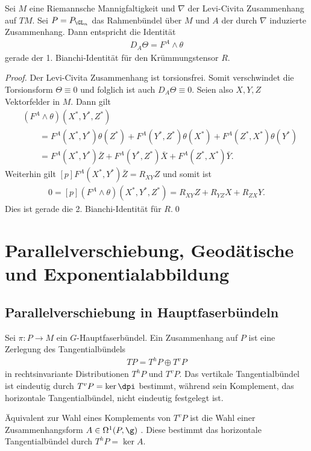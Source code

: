 \documentclass[%
	paper=a5,%
	fleqn,%
	DIV=18,%
	BCOR=0mm,
	fontsize=11pt,
	titlepage=false,%
	bibliography=totoc,
	DIV=18,%
	twoside=true,
	pdftitle=Riemannsche Geometrie,
	pdfauthor=Uwe Semmelmann,
	numbers=noendperiod]%
	{scrbook}
\begin{document}
\begin{lem}
Sei $M$ eine Riemannsche Mannigfaltigkeit und $\nabla$ der Levi-Civita
Zusammenhang auf $TM$. Sei $P=P_{\GL_n}$ das Rahmenbündel über $M$ und $A$ der
durch $\nabla$ induzierte Zusammenhang. Dann entspricht die Identität
\begin{align*}
D_A \Theta = F^A \wedge \theta
\end{align*}
gerade der 1. Bianchi-Identität für den Krümmungstensor $R$.\fish
\end{lem}
\begin{proof}
Der Levi-Civita Zusammenhang ist torsionsfrei. Somit verschwindet die
Torsionsform $\Theta \equiv 0$ und folglich ist auch $D_A \Theta \equiv 0$.
Seien also $X,Y,Z$ Vektorfelder in $M$. Dann gilt
\begin{align*}
&(F^A\wedge \theta)(X^*,Y^*,Z^*) \\
&\qquad=
F^A(X^*,Y^*)\theta(Z^*) + 
F^A(Y^*,Z^*)\theta(X^*) + 
F^A(Z^*,X^*)\theta(Y^*)\\
&\qquad =  
F^A(X^*,Y^*)\bar{Z} + 
F^A(Y^*,Z^*)\bar{X} + 
F^A(Z^*,X^*)\bar{Y}.
\end{align*}
Weiterhin gilt $[p]F^A(X^*,Y^*)\bar{Z} = R_{XY}Z$ und somit ist
\begin{align*}
0 =  [p](F^A\wedge \theta)(X^*,Y^*,Z^*) = 
R_{XY}Z
 + R_{YZ}X + R_{ZX}Y.
\end{align*}
Dies ist gerade die 2. Bianchi-Identität für $R$.\qed
\end{proof}


\chapter{Parallelverschiebung, Geodätische und Exponentialabbildung}

\section{Parallelverschiebung in Hauptfaserbündeln}

Sei $\pi\colon P\to M$ ein $G$-Hauptfaserbündel. Ein Zusammenhang auf $P$ ist eine Zerlegung des Tangentialbündels
\begin{align*}
TP = T^hP\oplus T^vP
\end{align*}
in rechtsinvariante Distributionen $T^hP$ und $T^vP$. Das vertikale Tangentialbündel ist eindeutig durch $T^vP=\ker \dpi$ bestimmt, während sein Komplement, das horizontale Tangentialbündel, nicht eindeutig festgelegt ist.

Äquivalent zur Wahl eines Komplements von $T^vP$ ist die Wahl einer Zusammenhangsform $A\in\Omega^1(P,\g)$ . Diese bestimmt das horizontale Tangentialbündel durch $T^hP=\ker A$.
\end{document}
